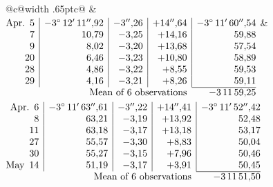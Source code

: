 \noindent\begin{tabular}{@{}c@{\hspace{.4em}\vrule width .65pt\hspace{.4em}}c@{}}
 &
 \\[.18ex]
\(\begin{array}[t]{@{}r|r|r|r|r@{}}
\text{Apr.}\enspace 5 & -3^\circ\,12'\,11''{,}92 & -3''{,}26 & +14''{,}64 & -3^\circ\,11'\,60''{,}54\\
7 & 10{,}79 & -3{,}25 & +14{,}16 & 59{,}88\\
9 & 8{,}02 & -3{,}20 & +13{,}68 & 57{,}54\\
20 & 6{,}46 & -3{,}23 & +10{,}80 & 58{,}89\\
28 & 4{,}86 & -3{,}22 & +8{,}55 & 59{,}53\\
29 & 4{,}16 & -3{,}21 & +8{,}26 & 59{,}11\\
\cline{5-5}
\multicolumn{4}{r}{\text{Mean of 6 observations}} & -3\,11\,59{,}25
\end{array}\)
&
\(\begin{array}[t]{@{}r|r|r|r|r@{}}
\text{Apr.}\enspace 6 & -3^\circ\,11'\,63''{,}61 & -3''{,}22 & +14''{,}41 & -3^\circ\,11'\,52''{,}42\\
8 & 63{,}21 & -3{,}19 & +13{,}92 & 52{,}48\\
11 & 63{,}18 & -3{,}17 & +13{,}18 & 53{,}17\\
27 & 55{,}57 & -3{,}30 & +8{,}83 & 50{,}04\\
30 & 55{,}27 & -3{,}15 & +7{,}96 & 50{,}46\\
\text{May}\enspace 14 & 51{,}19 & -3{,}17 & +3{,}91 & 50{,}45\\
\cline{5-5}
\multicolumn{4}{r}{\text{Mean of 6 observations}} & -3\,11\,51{,}50
\end{array}\)
\end{tabular}\par\medskip
